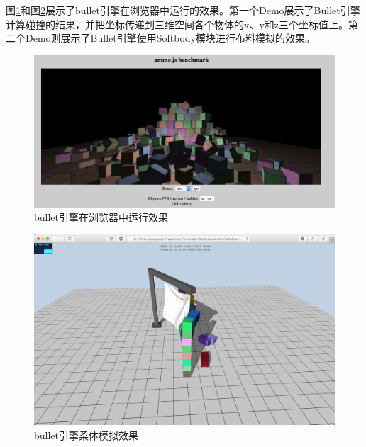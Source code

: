 图\ref{ammo-sample-html}和图\ref{ammo-cloth}展示了bullet引擎在浏览器中运行的效果。第一个Demo展示了Bullet引擎计算碰撞的结果，并把坐标传递到三维空间各个物体的x、y和z三个坐标值上。第二个Demo则展示了Bullet引擎使用Softbody模块进行布料模拟的效果。

\newpage

\begin{figure}[h!] %
    \centering
    \includegraphics[width=450bp]{figure/pic/ammo-sample-html.png}
    \caption{bullet引擎在浏览器中运行效果}
    \label{ammo-sample-html}
\end{figure}

\begin{figure}[h!] %
    \centering
    \includegraphics[width=450bp]{figure/pic/ammo-cloth.png}
    \caption{bullet引擎柔体模拟效果}
    \label{ammo-cloth}
\end{figure}

